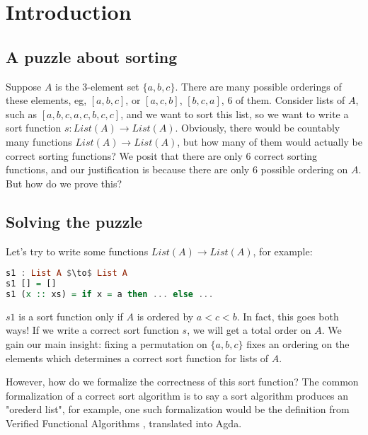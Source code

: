 \section{Introduction}
\label{sec:introduction}

\subsection*{A puzzle about sorting}

Suppose $A$ is the 3-element set $\{a,b,c\}$. There are many possible orderings of these elements,
eg, $[a,b,c]$, or $[a,c,b]$, $[b,c,a]$, 6 of them. 
Consider lists of $A$, such as $[a,b,c,a,c,b,c,c]$, and we want to sort this list, so we want to write a sort function $s\colon List(A) \to List(A)$.
Obviously, there would be countably many functions $List(A) \to List(A)$, but how many of them
would actually be correct sorting functions? We posit that there are only 6 correct sorting
functions, and our justification is because there are only 6 possible ordering on $A$.
But how do we prove this?

\subsection*{Solving the puzzle}

Let's try to write some functions $List(A) \to List(A)$, for example:
\begin{lstlisting}[language=haskell]
s1 : List A $\to$ List A
s1 [] = []
s1 (x :: xs) = if x = a then ... else ...
\end{lstlisting}
$s1$ is a sort function only if $A$ is ordered by $a < c < b$.
In fact, this goes both ways!
If we write a correct sort function $s$, we will get a total order on $A$.
We gain our main insight: fixing a permutation on $\{a,b,c\}$ fixes an ordering on the elements which determines a correct sort function for lists of $A$.


However, how do we formalize the correctness of this sort function?
The common formalization of a correct sort algorithm is to say a sort algorithm produces
an "orederd list", for example, one such formalization would be the definition
from Verified Functional Algorithms \cite{appel2016verified}, translated into Agda.


